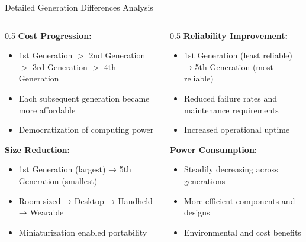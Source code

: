 \documentclass[aspectratio=169]{beamer}
\begin{document}
\begin{frame}{Detailed Generation Differences Analysis}

\begin{columns}
        \begin{column}{0.5\textwidth}
 \textbf{Cost Progression:}
    \begin{itemize}
        \item 1st Generation $>$ 2nd Generation  $>$  3rd Generation  $>$ 4th Generation
        \item Each subsequent generation became more affordable
        \item Democratization of computing power
    \end{itemize}
    
    \textbf{Size Reduction:}
    \begin{itemize}
        \item 1st Generation (largest) → 5th Generation (smallest)
        \item Room-sized → Desktop → Handheld → Wearable
        \item Miniaturization enabled portability
    \end{itemize}
    
        \end{column}

        \begin{column}{0.5\textwidth}
    \textbf{Reliability Improvement:}
    \begin{itemize}
        \item 1st Generation (least reliable) → 5th Generation (most reliable)
        \item Reduced failure rates and maintenance requirements
        \item Increased operational uptime
    \end{itemize}
    
    \textbf{Power Consumption:}
    \begin{itemize}
        \item Steadily decreasing across generations
        \item More efficient components and designs
        \item Environmental and cost benefits
    \end{itemize}
        \end{column}

        \end{columns}

        
   
    
\end{frame}
\end{document}

